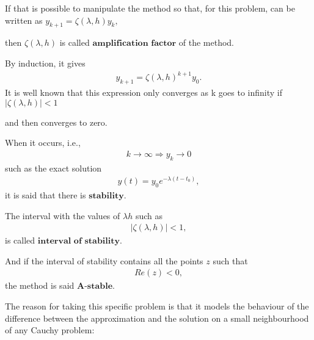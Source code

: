 \documentclass[letterpaper,10pt,english]{jupyterBook}
\begin{document}
\sphinxAtStartPar
If that is possible to manipulate the method so that, for this problem, can be written as \(y_{k+1} = \zeta(\lambda,h) y_k,\)

\sphinxAtStartPar
then \(\zeta(\lambda,h)\) is called \(\textbf{amplification factor}\) of the method.

\sphinxAtStartPar
By induction, it gives
\begin{equation*}
\begin{split}
y_{k+1} = \zeta(\lambda, h)^{k+1} y_0.
\end{split}
\end{equation*}
\sphinxAtStartPar
It is well known that this expression only converges as k goes to infinity if \( |\zeta(\lambda, h)| < 1\)

\sphinxAtStartPar
and then converges to zero.

\sphinxAtStartPar
When it occurs, i.e.,
\begin{equation*}
\begin{split}
    k \rightarrow \infty \Rightarrow y_k \rightarrow 0
\end{split}
\end{equation*}
\sphinxAtStartPar
such as the exact solution
\begin{equation*}
\begin{split}
    y(t) = y_0 e^{-\lambda (t-t_0)},
\end{split}
\end{equation*}
\sphinxAtStartPar
it is said that there is \(\textbf{stability}\).

\sphinxAtStartPar
The interval with the values of \(\lambda h\) such as
\begin{equation*}
\begin{split}
|\zeta(\lambda, h)|<1,
\end{split}
\end{equation*}
\sphinxAtStartPar
is called \(\textbf{interval of stability}\).

\sphinxAtStartPar
And if the interval of stability contains all the points \(z\) such that
\begin{equation*}
\begin{split}
    Re(z) < 0,
\end{split}
\end{equation*}
\sphinxAtStartPar
the method is said \(\textbf{A-stable}\).

\sphinxAtStartPar
The reason for taking this specific problem is that it models the behaviour of the difference between the approximation and the solution on a small neighbourhood of any Cauchy problem:
\end{document}
